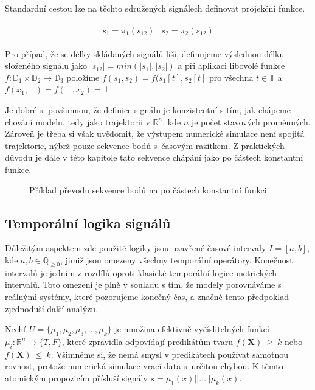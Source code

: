 Standardní cestou lze na těchto sdružených signálech definovat projekční funkce.

\begin{align}\label{eq:signals:pairing}
\begin{array}{ll}
s_1 = \pi_1(s_{12})		& s_2 = \pi_2(s_{12})
\end{array}
\end{align}

Pro případ, že se délky skládaných signálů liší, definujeme výslednou délku
složeného signálu jako $|s_{12}| = min(|s_1|, |s_2|)$ a při aplikaci libovolé
funkce $f: \mathbb{D}_1 \times \mathbb{D}_2 \rightarrow \mathbb{D}_3$
položíme $f(s_1, s_2) = f(s_1[t], s_2[t]$ pro všechna $t \in \mathbb{T}$ a
$f(x_1, \bot) = f(\bot, x_2) = \bot$.

Je dobré si povšimnou, že definice signálu je konzistentní s tím, jak chápeme chování modelu,
tedy jako trajektorii v $\mathbb{R}^n$, kde $n$ je počet sta\-vo\-vých proménných. Zároveň
je třeba si však uvědomit, že výstupem numerické simulace není spojitá trajektorie, nýbrž pouze
sekvence bodů s~ča\-so\-vým razítkem. Z praktických důvodu je dále v této kapitole tato sekvence
chá\-pá\-ní jako po částech konstantní funkce.

\begin{figure}[h!]
\begin{center}
\end{center}
\caption{Příklad převodu sekvence bodů na po částech konstantní funkci.}
\end{figure}

\subsection{Temporální logika signálů}
Důležitým aspektem zde použité logiky jsou uzavřené časové intervaly $I = [a, b]$, kde $a, b \in \mathbb{Q}_{\geq0}$,
jimiž jsou omezeny všechny temporální operátory. Konečnost intervalů je jedním z rozdílů
oproti klasické temporální logice metrických intervalů. Toto omezení je plně v souladu s tím,
že modely porovnáváme s reálnými systémy, které pozorujeme konečný čas, a značně tento předpoklad
zjedno\-du\-ší další analýzu.

Nechť $U = \{\mu_1, \mu_2, \mu_3, \ldots, \mu_k\}$ je množina efektivně vyčíslitelných funkcí
$\mu_i: \mathbb{R}^n \rightarrow \{T, F\}$, které zpravidla odpovídají predikátům tvaru
$f(\mathbf{X})~\geq~k$ nebo $f(\mathbf{X})~\leq~k$. Všimněme si, že nemá smysl v predikátech
používat samotnou rovnost, protože numerická simulace vrací data s~určitou chybou.
K těmto atomickým propozicím přísluší signály $s = \mu_1(x)|| \ldots|| \mu_k(x)$.

